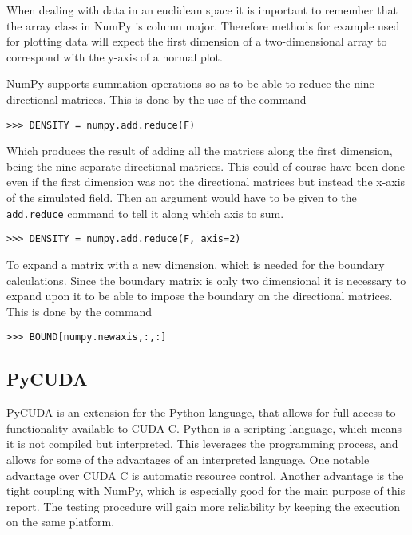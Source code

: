 When dealing with data in an euclidean space it is important to remember that the array class in NumPy is column major. Therefore methods for example used for plotting data will expect the first dimension of a two-dimensional array to correspond with the y-axis of a normal plot. 

NumPy supports summation operations so as to be able to reduce the nine directional matrices. This is done by the use of the command

\begin{verbatim}
>>> DENSITY = numpy.add.reduce(F)
\end{verbatim}

Which produces the result of adding all the matrices along the first dimension, being the nine separate directional matrices. This could of course have been done even if the first dimension was not the directional matrices but instead the x-axis of the simulated field. Then an argument would have to be given to the \texttt{add.reduce} command to tell it along which axis to sum.

\begin{verbatim}
>>> DENSITY = numpy.add.reduce(F, axis=2)
\end{verbatim}

To expand a matrix with a new dimension, which is needed for the boundary calculations. Since the boundary matrix is only two dimensional it is necessary to expand upon it to be able to impose the boundary on the directional matrices. This is done by the command

\begin{verbatim}
>>> BOUND[numpy.newaxis,:,:]
\end{verbatim}



\subsection{PyCUDA}
PyCUDA is an extension for the Python language, that allows for full access to functionality available to CUDA C. Python is a scripting language, which means it is not compiled but interpreted. This leverages the programming process, and allows for some of the advantages of an interpreted language. One notable advantage over CUDA C is automatic resource control. Another advantage is the tight coupling with NumPy, which is especially good for the main purpose of this report. The testing procedure will gain more reliability by keeping the execution on the same platform.

